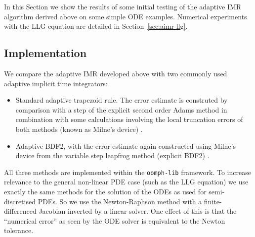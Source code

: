 
In this Section we show the results of some initial testing of the adaptive IMR algorithm derived above on some simple ODE examples.
Numerical experiments with the LLG equation are detailed in Section~\ref{sec:aimr-llg}.


\subsection{Implementation}
\label{sec:aimr-implementation}

We compare the adaptive IMR developed above with two commonly used adaptive implicit time integrators:
\begin{itemize}
\item Standard adaptive trapezoid rule. 
  The error estimate is construted by comparison with a step of the explicit second order Adams method in combination with some calculations involving the local truncation errors of both methods (known as Milne's device) \cite[pg. 707]{GreshoSani}.
\item Adaptive BDF2, with the error estimate again constructed using Milne's device from the variable step leapfrog method (\ie explicit BDF2) \cite[pg. 715]{GreshoSani}.
\end{itemize}

All three methods are implemented within the \texttt{oomph-lib} framework.
To increase relevance to the general non-linear PDE case (such as the LLG equation) we use exactly the same methods for the solution of the ODEs as used for semi-discretised PDEs.
So we use the Newton-Raphson method with a finite-differenced Jacobian inverted by a linear solver.
One effect of this is that the ``numerical error'' as seen by the ODE solver is equivalent to the Newton tolerance.

